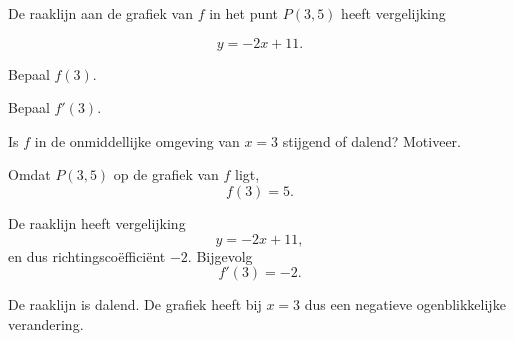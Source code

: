 \documentclass{ximera}
\begin{document}
\begin{oefening}{\oefB}

De raaklijn aan de grafiek van $f$ in het punt $P(3,5)$ heeft
vergelijking

\[
y=-2x+11.
\]

\begin{question}
Bepaal $f(3)$.
\end{question}

\begin{question}
Bepaal $f'(3)$.
\end{question}

\begin{question}
Is $f$ in de onmiddellijke omgeving van $x=3$ stijgend of dalend?
Motiveer.
\end{question}

\begin{oplossing}

Omdat $P(3,5)$ op de grafiek van $f$ ligt,
\[
\boxed{f(3)=5}.
\]

De raaklijn heeft vergelijking
\[
y=-2x+11,
\]
en dus richtingscoëfficiënt $-2$. Bijgevolg
\[
\boxed{f'(3)=-2}.
\]

De raaklijn is dalend. De grafiek heeft bij $x=3$ dus een negatieve
ogenblikkelijke verandering.

\end{oplossing}

\end{oefening}


\end{document}
